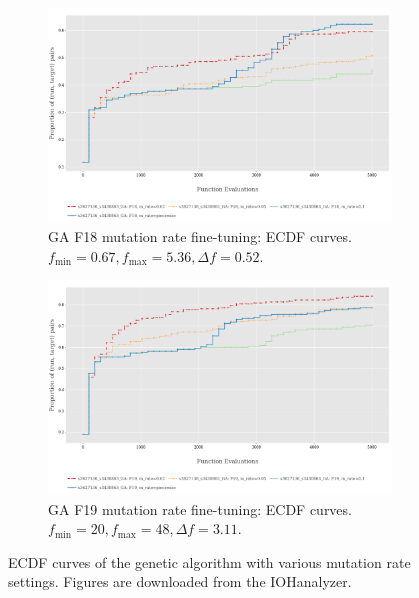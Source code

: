\documentclass{article}
\begin{document}
\begin{figure}[!ht]
    \centering
    \begin{subfigure}[h]{0.95\linewidth}
        \includegraphics[width=\linewidth]{ga/f18/mrate_ecdf.png}
        \caption{GA F18 mutation rate fine-tuning: ECDF curves. $f_{\min} = 0.67, f_{\max} = 5.36, \Delta f = 0.52$.}
    \end{subfigure}
    \hfill
    \begin{subfigure}[h]{0.95\linewidth}
        \includegraphics[width=\linewidth]{ga/f19/mrate_ecdf.png}
        \caption{GA F19 mutation rate fine-tuning: ECDF curves. $f_{\min} = 20, f_{\max} = 48, \Delta f = 3.11$.}
    \end{subfigure}
    \caption{ECDF curves of the genetic algorithm with various mutation rate settings. Figures are downloaded from the IOHanalyzer.}
    \label{fig:experi-ga-mrate-ecdf}
\end{figure}
\end{document}
